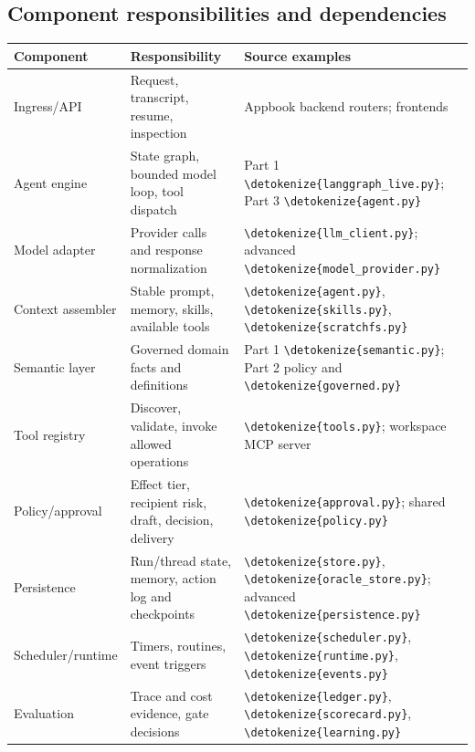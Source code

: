 \documentclass[11pt,letterpaper]{article}
\newcommand{\src}[1]{\expandafter\nolinkurl\expandafter{\detokenize{#1}}}
\begin{document}
\subsection{Component responsibilities and dependencies}
\begin{longtable}{>{\raggedright\arraybackslash}p{.22\linewidth}>{\raggedright\arraybackslash}p{.35\linewidth}>{\raggedright\arraybackslash}p{.35\linewidth}}\toprule
Component & Responsibility & Source examples \\\midrule\endhead
Ingress/API & Request, transcript, resume, inspection & Appbook backend routers; frontends \\
Agent engine & State graph, bounded model loop, tool dispatch & Part 1 \src{langgraph_live.py}; Part 3 \src{agent.py} \\
Model adapter & Provider calls and response normalization & \src{llm_client.py}; advanced \src{model_provider.py} \\
Context assembler & Stable prompt, memory, skills, available tools & \src{agent.py}, \src{skills.py}, \src{scratchfs.py} \\
Semantic layer & Governed domain facts and definitions & Part 1 \src{semantic.py}; Part 2 policy and \src{governed.py} \\
Tool registry & Discover, validate, invoke allowed operations & \src{tools.py}; workspace MCP server \\
Policy/approval & Effect tier, recipient risk, draft, decision, delivery & \src{approval.py}; shared \src{policy.py} \\
Persistence & Run/thread state, memory, action log and checkpoints & \src{store.py}, \src{oracle_store.py}; advanced \src{persistence.py} \\
Scheduler/runtime & Timers, routines, event triggers & \src{scheduler.py}, \src{runtime.py}, \src{events.py} \\
Evaluation & Trace and cost evidence, gate decisions & \src{ledger.py}, \src{scorecard.py}, \src{learning.py} \\
\bottomrule\end{longtable}
\end{document}
